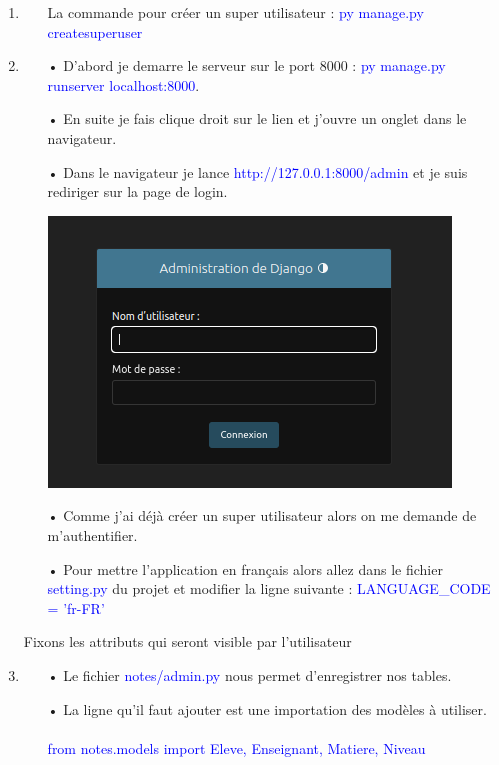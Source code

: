 \documentclass[10pt,a4paper]{article}
\begin{document}
\begin{enumerate}

\item 
\begin{itemize}
\item[] La commande pour créer un super utilisateur :  \textcolor{blue}{py manage.py createsuperuser}


\end{itemize}

\item
\begin{itemize}
\item[•] D'abord je demarre le serveur sur le port 8000 : \textcolor{blue}{py manage.py runserver localhost:8000}.
\item[•] En suite je fais clique droit sur le lien et j'ouvre un onglet dans le navigateur.

\item[•] Dans le navigateur je lance \textcolor{blue}{http://127.0.0.1:8000/admin} et je suis rediriger sur la page de login.\\
\begin{center}
\includegraphics[scale=0.5]{us.png}\\
\end{center}


\item[•] Comme j'ai déjà créer un super utilisateur alors on me demande de m'authentifier.

\item[•] Pour mettre l'application en français alors allez dans le fichier \textcolor{blue}{setting.py} du projet et modifier la ligne suivante : \textcolor{blue}{LANGUAGE\_CODE = 'fr-FR'}
\end{itemize}

Fixons les attributs qui seront visible par l'utilisateur
\item
\begin{itemize}
\item[•] Le fichier \textcolor{blue}{notes/admin.py} nous permet d'enregistrer nos tables.
\item[•] La ligne qu'il faut ajouter est une importation des modèles à utiliser.\\\\
\textcolor{blue}{from notes.models import  Eleve, Enseignant, Matiere, Niveau}


\end{itemize}
\end{enumerate}
\end{document}
